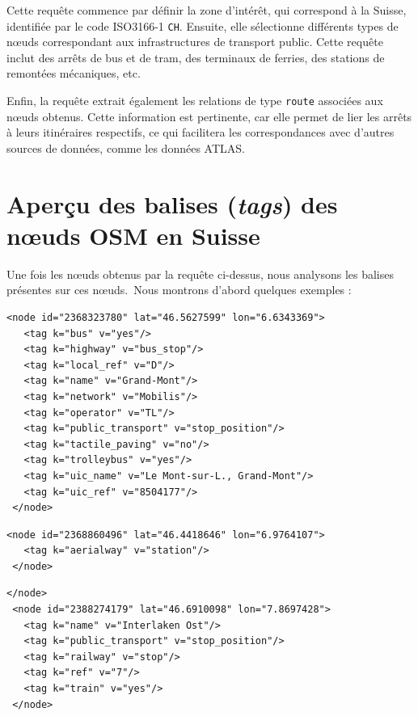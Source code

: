Cette requête commence par définir la zone d’intérêt, qui correspond à la Suisse, identifiée par le code ISO3166-1 \texttt{CH}. Ensuite, elle sélectionne différents types de nœuds correspondant aux infrastructures de transport public. Cette requête inclut des arrêts de bus et de tram, des terminaux de ferries, des stations de remontées mécaniques, etc.


Enfin, la requête extrait également les relations de type \texttt{route} associées aux nœuds obtenus. Cette information est pertinente, car elle permet de lier les arrêts à leurs itinéraires respectifs, ce qui facilitera les correspondances avec d’autres sources de données, comme les données ATLAS.

\section{Aperçu des balises (\textit{tags}) des nœuds OSM en Suisse}
Une fois les nœuds obtenus par la requête ci-dessus, nous analysons les balises présentes sur ces nœuds.\
Nous montrons d’abord quelques exemples :
\begin{tcolorbox}[colback=gray!10, colframe=brown, title=OSM N\oe ud : Grand-Mont]
\begin{verbatim}
<node id="2368323780" lat="46.5627599" lon="6.6343369">
   <tag k="bus" v="yes"/>
   <tag k="highway" v="bus_stop"/>
   <tag k="local_ref" v="D"/>
   <tag k="name" v="Grand-Mont"/>
   <tag k="network" v="Mobilis"/>
   <tag k="operator" v="TL"/>
   <tag k="public_transport" v="stop_position"/>
   <tag k="tactile_paving" v="no"/>
   <tag k="trolleybus" v="yes"/>
   <tag k="uic_name" v="Le Mont-sur-L., Grand-Mont"/>
   <tag k="uic_ref" v="8504177"/>
 </node>
\end{verbatim}
\end{tcolorbox}
\begin{tcolorbox}[colback=gray!10, colframe=brown, title=OSM N\oe ud sans nom]
\begin{verbatim}
<node id="2368860496" lat="46.4418646" lon="6.9764107">
   <tag k="aerialway" v="station"/>
 </node>
\end{verbatim}
\end{tcolorbox}
\begin{tcolorbox}[colback=gray!10, colframe=brown, title=OSM N\oe ud : Interlaken Ost]
\begin{verbatim}
</node>
 <node id="2388274179" lat="46.6910098" lon="7.8697428">
   <tag k="name" v="Interlaken Ost"/>
   <tag k="public_transport" v="stop_position"/>
   <tag k="railway" v="stop"/>
   <tag k="ref" v="7"/>
   <tag k="train" v="yes"/>
 </node>
\end{verbatim}
\end{tcolorbox}

